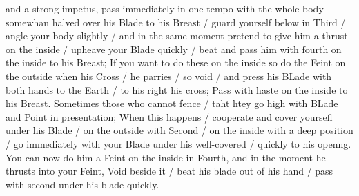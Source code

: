 \newpage


\newpage


and a strong impetus, pass immediately in one tempo with the whole
body somewhan halved over his Blade to his Breast / guard yourself
below in Third / angle your body slightly / and in the same moment
pretend to give him a thrust on the inside / upheave
your Blade quickly / beat and pass him with fourth on the inside to
his Breast; If you want to do these on the inside so do the Feint on
the outside when his Cross / he parries / so void / and press his
BLade with both hands to the Earth / to his right his cross; Pass with
haste on the inside to his Breast. Sometimes those who cannot fence /
taht htey go high with BLade and Point in presentation; When this
happens / cooperate and cover yoursefl under his Blade / on the
outside with Second / on the inside with a deep position / go
immediately with your Blade under his well-covered / quickly to his
openng. You can now do him a Feint on the inside in Fourth, and in the
moment he thrusts into your Feint, Void beside it  / beat his blade
out of his hand / pass with second under his blade quickly.


